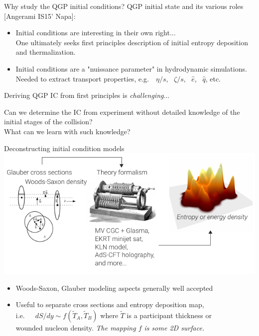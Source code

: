 \documentclass[xcolor=dvipsnames]{beamer}
\begin{document}
\usebackgroundtemplate{}

\begin{frame}{Why study the QGP initial conditions?}
    \bigskip
    QGP initial state and its various roles {\scriptsize [Angerami IS15' Napa]}: \\
    \begin{itemize}
        \item Initial conditions are interesting in their own right... \\
        \medskip
        One ultimately seeks first principles description of initial entropy 
        deposition and thermalization. \\
        \medskip
        \item Initial conditions are a "nuissance parameter" in hydrodynamic 
              simulations. Needed to extract transport properties, e.g.\ 
              ~$\eta/s$, ~$\zeta/s$, ~$\hat{e}$, ~$\hat{q}$, etc.     
    \end{itemize}
    \medskip
    Deriving QGP IC from first principles is \emph{challenging}...\\ 
    \medskip
    \begin{tcolorbox}[width=\textwidth, colback=theme!10, colframe=theme!0]
        Can we determine the IC from experiment without detailed knowledge of 
        the initial stages of the collision?
        \medskip \centering \\
        What can we learn with such knowledge?
    \end{tcolorbox}
\end{frame}

\begin{frame}{Deconstructing initial condition models}
    \bigskip
    \includegraphics{deconstructing} \\
    \begin{itemize}
        \small
        \item Woods-Saxon, Glauber modeling aspects generally well accepted \\
        \item Useful to separate cross sections and entropy deposition map, \\
        \medskip i.e.\ ~~$dS/dy \sim f(\tilde{T}_A, \tilde{T}_B)$ where $\tilde{T}$ 
                 is a participant thickness or \\
        \smallskip wounded nucleon density. \emph{The mapping $f$ is some 2D surface.}
    \end{itemize}
\end{frame}
\end{document}
